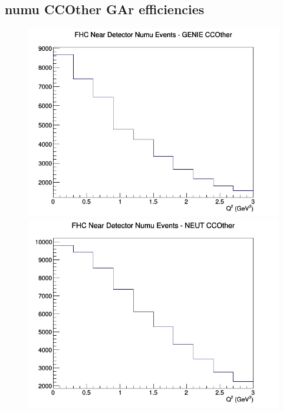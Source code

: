 \documentclass[12pt]{article}
\begin{document}
\subsection{numu CCOther GAr efficiencies}
\begin{figure}[h]
\includegraphics[width=\linewidth]{eff_Q2/GAr/CCOther_FHC_ND_numu_Q2_GENIE.png}
\endminipage
{}
\includegraphics[width=\linewidth]{eff_Q2/GAr/CCOther_FHC_ND_numu_Q2_NEUT.png}
\endminipage
{}

\end{figure}
\end{document}
